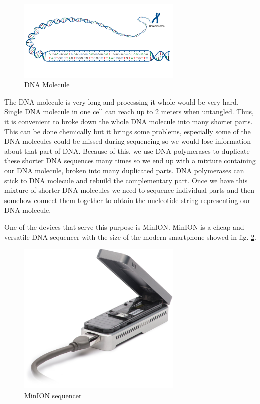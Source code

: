 \begin{figure}
\centerline{\includegraphics[width=0.7\textwidth, height=0.3\textheight]{images/acgt}}
\caption[DNA]{DNA Molecule}
\label{obr:acgt}
\end{figure}

The DNA molecule is very long and processing it whole would be very hard. Single
DNA molecule in one cell can reach up to 2 meters when untangled.
Thus, it is convenient to broke down the whole DNA molecule into many shorter parts.
This can be done chemically but it brings some problems, especially some of the
DNA molecules could be missed during sequencing so we would lose information about
that part of DNA. Because of this, we use DNA polymerases to duplicate these shorter DNA sequences
many times so we end up with a mixture containing our DNA molecule, broken into
many duplicated parts. DNA polymerases can stick to DNA molecule and rebuild the complementary
part. Once we have this mixture of shorter DNA molecules we need to sequence individual
parts and then somehow connect them together to obtain the nucleotide string representing
our DNA molecule.

One of the devices that serve this purpose is MinION\cite{lu2016oxford}. MinION is
a cheap and versatile DNA sequencer with the size of the modern smartphone showed in fig.
\ref{obr:minIon}.

\begin{figure}
\centerline{\includegraphics[width=0.7\textwidth, height=0.3\textheight]{images/minion}}
\caption[MinION]{MinION sequencer}
\label{obr:minIon}
\end{figure}

